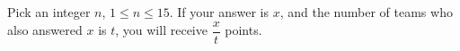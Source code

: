 Pick an integer $n$, $1 \le n \le 15$. If your answer is $x$, and the number of teams who also answered $x$ is $t$, you will receive $\dfrac{x}{t}$ points.

